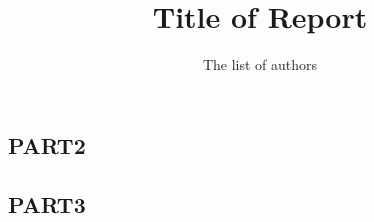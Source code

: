 \documentclass[a4paper, twoside]{report}
\title{\textbf{\huge{Title of Report}}}
\author{The list of authors}
\begin{document}
\maketitle

\begin{multicols}{2}
  \tableofcontents
\end{multicols}





\newpage
\begin{mytitlebox}
\part*{PART2}
\end{mytitlebox}





\newpage
\begin{mytitlebox}
\part*{PART3}
\end{mytitlebox}


\end{document}
